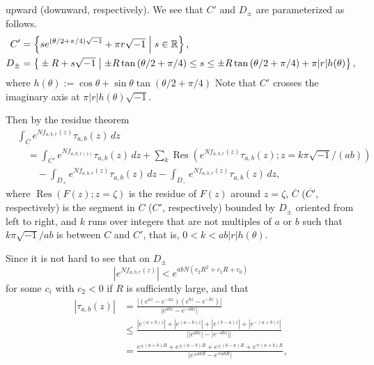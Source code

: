 \documentclass[a4paper,draft]{amsart}
\theoremstyle{plain}
\theoremstyle{definition}
\theoremstyle{remark}
\newcommand{\R}{\mathbb{R}}
\newcommand{\Res}{\operatorname{Res}}
\numberwithin{equation}{section}
\begin{document}
upward (downward, respectively).
We see that $C'$ and $D_{\pm}$ are parameterized as follows.
\begin{equation*}
\begin{split}
  C'
  &=
  \left\{
    se^{(\theta/2+\pi/4)\sqrt{-1}}+\pi{r}\sqrt{-1}
    \Bigm|
    s\in\R
  \right\},
  \\
  D_{\pm}
  &=
  \left\{
    \vphantom{\bigr)}
    \pm{R}+s\sqrt{-1}
    \bigm|
    \pm{R}\tan\left(\theta/2+\pi/4\right)
    \le{s}
    \le
    \pm{R}\tan\left(\theta/2+\pi/4\right)
    +
    \pi|r|h(\theta)
  \right\},
\end{split}
\end{equation*}
where $h(\theta):=\cos\theta+\sin\theta\tan(\theta/2+\pi/4)$
Note that $C'$ crosses the imaginary axis at $\pi|r|h(\theta)\sqrt{-1}$.
\par
Then by the residue theorem
\begin{equation*}
\begin{split}
  &
  \int_{\overline{C}}
  e^{Nf_{a,b,r}(z)}\tau_{a,b}(z)\,dz
  \\
  &\quad
  =
  \int_{\overline{C'}}
  e^{Nf_{a,b,r(z)}}\tau_{a,b}(z)\,dz
  +
  \sum_{k}
  \Res
  \left(
    e^{Nf_{a,b,r}(z)}\tau_{a,b}(z);z=k\pi\sqrt{-1}/(ab)
  \right)
  \\
  &\quad\quad
  -\int_{D_+}
  e^{Nf_{a,b,r}(z)}\tau_{a,b}(z)\,dz
  -\int_{D_-}
  e^{Nf_{a,b,r}(z)}\tau_{a,b}(z)\,dz,
\end{split}
\end{equation*}
where $\Res(F(z);z=\zeta)$ is the residue of $F(z)$ around $z=\zeta$,
$\overline{C}$ ($\overline{C'}$, respectively)
is the segment in $C$ (${C'}$, respectively) bounded by
$D_{\pm}$ oriented from left to right,
and $k$ runs over integers that are not multiples of $a$ or $b$ such that
$k\pi\sqrt{-1}/ab$ is between $C$ and $C'$, that is, $0<k<ab|r|h(\theta)$.
\par
Since it is not hard to see that on $D_{\pm}$
\begin{equation*}
  \left|e^{Nf_{a,b,r}(z)}\right|
  <
  e^{abN\left(c_2R^2+c_1R+c_0\right)}
\end{equation*}
for some $c_i$ with $c_2<0$ if $R$ is sufficiently large, and that
\begin{equation*}
\begin{split}
  \left|\tau_{a,b}(z)\right|
  &=
  \frac{\left|\left(e^{az}-e^{-az}\right)
              \left(e^{bz}-e^{-bz}\right)\right|}
       {\left|e^{abz}-e^{-abz}\right|}
  \\
  &\le
  \frac{\left|e^{(a+b)z}\right|
        +
        \left|e^{(a-b)z}\right|
        +
        \left|e^{(b-a)z}\right|
        +
        \left|e^{-(a+b)z}\right|}
       {\bigl|\left|e^{abz}\right|-\left|e^{-abz}\right|\bigr|}
  \\
  &=
  \frac{e^{\pm(a+b)R}
        +
        e^{\pm(a-b)R}
        +
        e^{\pm(b-a)R}
        +
        e^{\mp(a+b)R}}
       {\left|e^{\pm{abR}}-e^{\mp{abR}}\right|},
\end{split}
\end{equation*}
\end{document}

